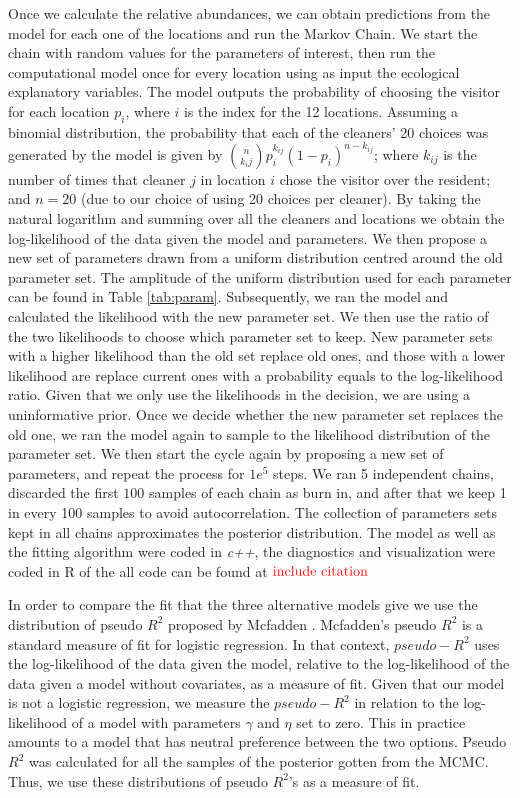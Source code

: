 \documentclass[]{rsos}%
\begin{document}
Once we calculate the relative abundances, we can obtain predictions from
the model for each one of the locations and run the Markov Chain. We start the
chain with random values for the parameters of interest, then run the
computational model once for every location using as input the ecological
explanatory variables. The model outputs the probability of choosing the visitor
for each location \(p_i\), where \(i\) is the index for the 12 locations. Assuming a
binomial distribution, the probability that each of the cleaners' 20 choices was
generated by the model is given by \(\binom{n}{k_ij}p^{k_{ij}}_i (1-p_i)^{n-k_{ij}}\);
where \(k_{ij}\) is the number of times that cleaner \(j\) in location \(i\) chose the
visitor over the resident; and \(n=20\) (due to our choice of using 20
choices per cleaner). By taking the natural logarithm and summing over all
the cleaners and locations we obtain the log-likelihood of the data
given the model and parameters. We then propose a new set of parameters drawn
from a uniform distribution centred around the old parameter set. The amplitude
of the uniform distribution used for each parameter can be found in Table
\ref{tab:param}. Subsequently, we ran the model and calculated the likelihood
with the new parameter set. We then use the ratio of the two likelihoods to
choose which parameter set to keep. New parameter sets with a higher likelihood
than the old set replace old ones, and those with a lower likelihood are replace
current ones with a probability equals to the log-likelihood ratio.
Given that we only use the likelihoods in the decision, we are using a
uninformative prior. Once we decide whether the new parameter set replaces
the old one, we ran the model again to sample to the likelihood
distribution of the parameter set. We then start
the cycle again by proposing a new set of parameters, and repeat the process for
\(1e^5\) steps. We ran 5 independent chains, discarded the first
\(100\) samples of each chain as burn in, and after that we keep 1 in every
100 samples to avoid autocorrelation. The collection of parameters sets kept in
all chains approximates the posterior distribution. The model as well as the
fitting algorithm were coded in \emph{c++}, the diagnostics and visualization were
coded in R \citep{rcoreteam_Language_2021} of the all code can be found at
\(\color{red}{\text{include citation}}\)

In order to compare the fit that the three alternative models give we use the
distribution of pseudo \(R^2\) proposed by Mcfadden \citep{mcfadden_Conditional_1974}.
Mcfadden's pseudo \(R^2\) is a standard measure of fit for logistic regression.
In that context, \(pseudo-R^2\) uses the log-likelihood of the data given
the model, relative to the log-likelihood of the data given a
model without covariates, as a measure of fit. Given that our
model is not a logistic regression, we measure the \(pseudo-R^2\) in
relation to the log-likelihood of a model
with parameters \(\gamma\) and \(\eta\) set to zero. This in practice
amounts to a model that has neutral preference between the two options.
Pseudo \(R^2\) was calculated for all the samples of the posterior gotten from
the MCMC. Thus, we use these distributions of pseudo \(R^2\)'s as a measure of
fit.
\end{document}
